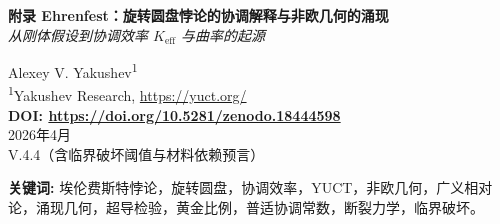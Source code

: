 \documentclass[12pt,a4paper]{article}
\newcommand{\Sodd}{S_{\mathrm{odd}}}
\newcommand{\Seven}{S_{\mathrm{even}}}
\begin{document}
	
	\begin{titlepage}
		\begin{center}
			\vspace*{1cm}
			\Huge\textbf{附录 Ehrenfest：旋转圆盘悖论的协调解释与非欧几何的涌现} \\
			\vspace{0.5cm}
			\Large\textit{从刚体假设到协调效率 \(K_{\mathrm{eff}}\) 与曲率的起源}
			\vspace{1.5cm}
			
			\Large Alexey V. Yakushev\textsuperscript{1} \\
			\vspace{0.3cm}
			\large \textsuperscript{1}Yakushev Research, \url{https://yuct.org/} \\
			\vspace{1cm}
			\textbf{DOI: \url{https://doi.org/10.5281/zenodo.18444598}} \\
			\vspace{1cm}
			2026年4月 \\ \large V.4.4（含临界破坏阈值与材料依赖预言）
			\vspace{2cm}
			
			\begin{minipage}{0.9\textwidth}
				\begin{abstract}
					\noindent
					埃伦费斯特悖论（1910）凸显了在考虑相对论长度收缩的情况下，维持旋转圆盘上欧几里得几何的不可能性。在广义相对论中，这一悖论通过为旋转观察者引入非欧几何得到解决。在此，我们在雅库舍夫统一协调理论中给出一种解释，该解释根植于附录 Ferra1.2 中导出的普适协调常数。我们表明，圆周的表观收缩是高协调效率 \(K_{\mathrm{eff}} > 1\) 的表现，这种高效率通过预分发的相互距离字典实现。基本常数 \(\Sodd = 6/5 = 1.2\)，\(\Seven = 4/5 = 0.8\)，它们的和 \(2\)，比值 \(3/2\)，以及关系式 \(\Sodd \varphi^2 \approx \pi\)（其中 \(\varphi\) 是黄金比例）提供了几何骨架。我们引入了\textbf{协调中心}（旋转轴）的概念，其存在依赖于协调物质。当角速度超过临界阈值时，材料的协调效率 \(K_{\mathrm{eff,mat}}\) 降至临界值 \(K_{\mathrm{crit}}\) 以下，导致协调的灾难性丧失——圆盘解体，轴作为物理上可区分的线不再存在。我们推导了以可测量材料参数（杨氏模量、密度、抗拉强度）表示的临界角速度的定量预言，并表明在极限 \(K_{\mathrm{eff,mat}}=1\) 时，恢复断裂力学的标准公式。我们将该框架与替代理论（广义相对论、经典弹性理论）进行比较，并展示其提供了新的可检验预言：超导盘在临界速度上与正常盘应有所不同，这是材料依赖协调效率的直接结果。给出了详细的实验方案，并为高温超导体圆盘提供了数值估计。
				\end{abstract}
			\end{minipage}
			\vspace{1cm}
			
			\noindent \textbf{关键词:} 埃伦费斯特悖论，旋转圆盘，协调效率，YUCT，非欧几何，广义相对论，涌现几何，超导检验，黄金比例，普适协调常数，断裂力学，临界破坏。
		\end{center}
	\end{titlepage}
	
\end{document}
